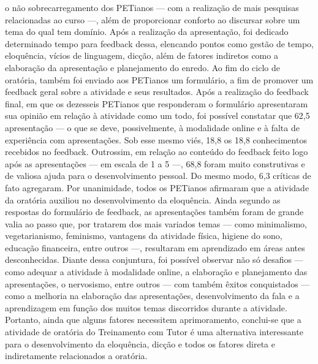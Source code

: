 o não sobrecarregamento dos PETianos — com a realização de mais pesquisas relacionadas ao 
curso —, além de proporcionar conforto ao discursar sobre um tema do qual tem domínio.
Após a realização da apresentação, foi dedicado determinado tempo para feedback dessa, 
elencando pontos como gestão de tempo, eloquência, vícios de linguagem, dicção, além de fatores 
indiretos como a elaboração da apresentação e planejamento do enredo. Ao fim do ciclo de 
oratória, também foi enviado aos PETianos um formulário, a fim de promover um feedback geral 
sobre a atividade e seus resultados.
Após a realização do feedback final, em que os dezesseis PETianos que responderam o 
formulário apresentaram sua opinião em relação à atividade como um todo, foi possível constatar 
que 62,5%
apresentação — o que se deve, possivelmente, à modalidade online e à falta de experiência com 
apresentações. Sob esse mesmo viés, 18,8%
os 18,8%
conhecimentos recebidos no feedback. 
Outrossim, em relação ao conteúdo do feedback feito logo após as apresentações — em 
escala de 1 a 5 —, 68,8%
foram muito construtivas e de valiosa ajuda para o desenvolvimento pessoal. Do mesmo modo, 
6,3%
críticas de fato agregaram. Por unanimidade, todos os PETianos afirmaram que a atividade da 
oratória auxiliou no desenvolvimento da eloquência.
Ainda segundo as respostas do formulário de feedback, as apresentações também foram de 
grande valia ao passo que, por tratarem dos mais variados temas — como minimalismo, 
vegetarianismo, feminismo, vantagens da atividade física, higiene do sono, educação financeira, 
entre outros —, resultaram em aprendizado em áreas antes desconhecidas.
Diante dessa conjuntura, foi possível observar não só desafios — como adequar a atividade 
à modalidade online, a elaboração e planejamento das apresentações, o nervosismo, entre outros 
— com também êxitos conquistados — como a melhoria na elaboração das apresentações, 
desenvolvimento da fala e a aprendizagem em função dos muitos temas discorridos durante a 
atividade. Portanto, ainda que alguns fatores necessitem aprimoramento, conclui-se que a atividade 
de oratória do Treinamento com Tutor é uma alternativa interessante para o desenvolvimento da 
eloquência, dicção e todos os fatores direta e indiretamente relacionados a oratória.

